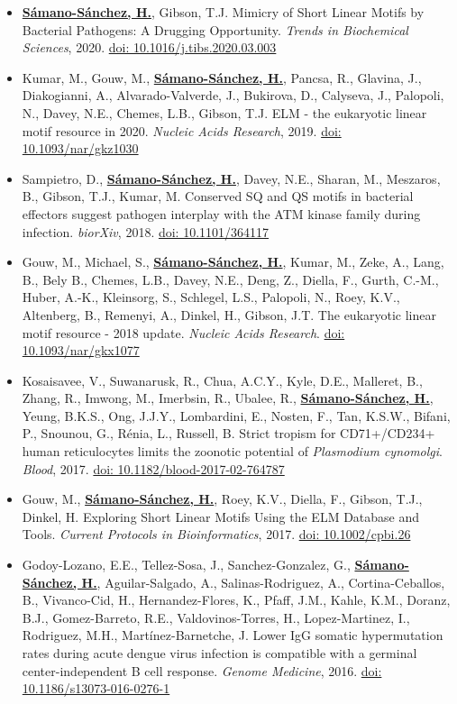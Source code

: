 \documentclass[11pt,a4paper,sans]{moderncv} %
\begin{document}
\begin{itemize}
  \item \textbf{\underline{S\'amano-S\'anchez, H.}}, Gibson, T.J. Mimicry of Short Linear Motifs by Bacterial Pathogens: A Drugging Opportunity. \textit{Trends in Biochemical Sciences}, 2020. \href{https://doi.org/10.1016/j.tibs.2020.03.003}{doi: 10.1016/j.tibs.2020.03.003}
  \item Kumar, M., Gouw, M., \textbf{\underline{S\'amano-S\'anchez, H.}}, Pancsa, R., Glavina, J., Diakogianni, A., Alvarado-Valverde, J., Bukirova, D., Calyseva, J., Palopoli, N., Davey, N.E., Chemes, L.B., Gibson, T.J. ELM - the eukaryotic linear motif resource in 2020. \textit{Nucleic Acids Research}, 2019. \href{https://doi.org/10.1093/nar/gkz1030}{doi: 10.1093/nar/gkz1030}
  \item Sampietro, D., \textbf{\underline{S\'amano-S\'anchez, H.}}, Davey, N.E., Sharan, M., Meszaros, B., Gibson, T.J., Kumar, M. Conserved SQ and QS motifs in bacterial effectors suggest pathogen interplay with the ATM kinase family during infection. \textit{biorXiv}, 2018. \href{https://doi.org/10.1101/364117}{doi: 10.1101/364117}
  \item Gouw, M., Michael, S., \textbf{\underline{S\'amano-S\'anchez, H.}}, Kumar, M., Zeke, A., Lang, B., Bely B., Chemes, L.B., Davey, N.E., Deng, Z., Diella, F., Gurth, C.-M., Huber, A.-K., Kleinsorg, S., Schlegel, L.S., Palopoli, N., Roey, K.V., Altenberg, B., Remenyi, A., Dinkel, H., Gibson, J.T. The eukaryotic linear motif resource - 2018 update. \textit{Nucleic Acids Research}. \href{https://doi.org/10.1093/nar/gkx1077}{doi: 10.1093/nar/gkx1077}
  \item Kosaisavee, V., Suwanarusk, R., Chua, A.C.Y., Kyle, D.E., Malleret, B., Zhang, R., Imwong, M., Imerbsin, R., Ubalee, R., \textbf{\underline{S\'amano-S\'anchez, H.}}, Yeung, B.K.S., Ong, J.J.Y., Lombardini, E., Nosten, F., Tan, K.S.W., Bifani, P., Snounou, G., R\'enia, L., Russell, B. Strict tropism for CD71+/CD234+ human reticulocytes limits the zoonotic potential of \textit{Plasmodium cynomolgi}. \textit{Blood}, 2017. \href{https://doi.org/10.1182/blood-2017-02-764787}{doi: 10.1182/blood-2017-02-764787}
  \item Gouw, M., \textbf{\underline{S\'amano-S\'anchez, H.}}, Roey, K.V., Diella, F., Gibson, T.J., Dinkel, H. Exploring Short Linear Motifs Using the ELM Database and Tools. \textit{Current Protocols in Bioinformatics}, 2017. \href{https://doi.org/10.1002/cpbi.26}{doi: 10.1002/cpbi.26}
  \item Godoy-Lozano, E.E., Tellez-Sosa, J., Sanchez-Gonzalez, G., \textbf{\underline{S\'amano-S\'anchez, H.}}, Aguilar-Salgado, A., Salinas-Rodriguez, A., Cortina-Ceballos, B., Vivanco-Cid, H., Hernandez-Flores, K., Pfaff, J.M., Kahle, K.M., Doranz, B.J., Gomez-Barreto, R.E., Valdovinos-Torres, H., Lopez-Martinez, I., Rodriguez, M.H., Mart\'inez-Barnetche, J. Lower IgG somatic hypermutation rates during acute dengue virus infection is compatible with a germinal center-independent B cell response. \textit{Genome Medicine}, 2016. \href{https://doi.org/10.1186/s13073-016-0276-1}{doi: 10.1186/s13073-016-0276-1}

\end{itemize}
\end{document}
